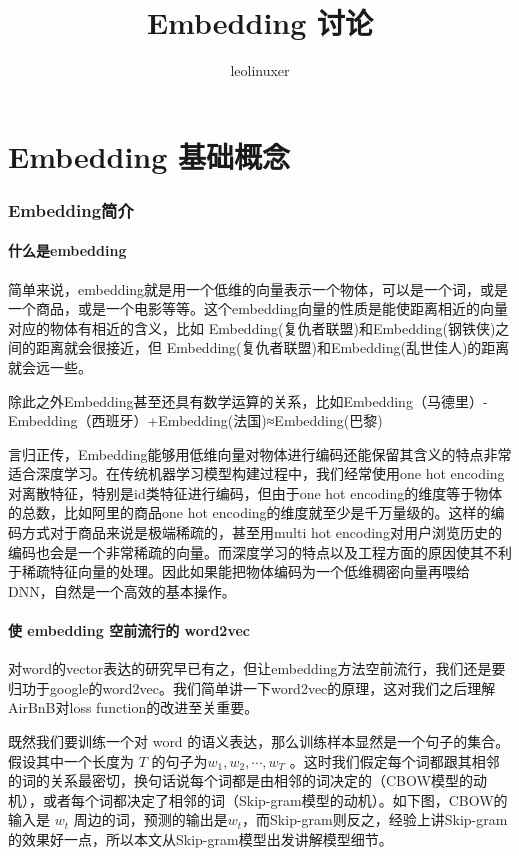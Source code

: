\documentclass[12pt]{article}
\title{Embedding 讨论}
\author{leolinuxer}
\begin{document}
\maketitle
\tableofcontents

\part{Embedding 基础概念}
\section{Embedding简介\cite{Embedding_From_Word2Vec_To_Item2Vec}}
\subsection{什么是embedding}
简单来说，embedding就是用一个低维的向量表示一个物体，可以是一个词，或是一个商品，或是一个电影等等。这个embedding向量的性质是能使距离相近的向量对应的物体有相近的含义，比如 Embedding(复仇者联盟)和Embedding(钢铁侠)之间的距离就会很接近，但 Embedding(复仇者联盟)和Embedding(乱世佳人)的距离就会远一些。

除此之外Embedding甚至还具有数学运算的关系，比如Embedding（马德里）-Embedding（西班牙）+Embedding(法国)≈Embedding(巴黎)

言归正传，Embedding能够用低维向量对物体进行编码还能保留其含义的特点非常适合深度学习。在传统机器学习模型构建过程中，我们经常使用one hot encoding对离散特征，特别是id类特征进行编码，但由于one hot encoding的维度等于物体的总数，比如阿里的商品one hot encoding的维度就至少是千万量级的。这样的编码方式对于商品来说是极端稀疏的，甚至用multi hot encoding对用户浏览历史的编码也会是一个非常稀疏的向量。而深度学习的特点以及工程方面的原因使其不利于稀疏特征向量的处理。因此如果能把物体编码为一个低维稠密向量再喂给DNN，自然是一个高效的基本操作。

\subsection{使 embedding 空前流行的 word2vec}
对word的vector表达的研究早已有之，但让embedding方法空前流行，我们还是要归功于google的word2vec。我们简单讲一下word2vec的原理，这对我们之后理解AirBnB对loss function的改进至关重要。

既然我们要训练一个对 word 的语义表达，那么训练样本显然是一个句子的集合。假设其中一个长度为 $T$ 的句子为$w_1, w_2, \cdots, w_T$ 。这时我们假定每个词都跟其相邻的词的关系最密切，换句话说每个词都是由相邻的词决定的（CBOW模型的动机），或者每个词都决定了相邻的词（Skip-gram模型的动机）。如下图，CBOW的输入是 $w_t$ 周边的词，预测的输出是$w_t$，而Skip-gram则反之，经验上讲Skip-gram的效果好一点，所以本文从Skip-gram模型出发讲解模型细节。
\end{document}
